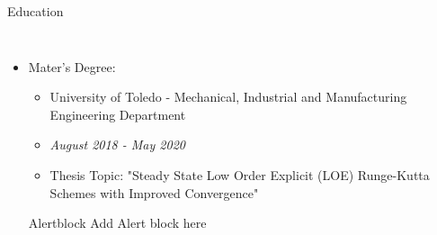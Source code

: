 
\begin{frame}{Education}
\begin{columns}
        \begin{itemize}
        \item Mater's Degree: 
        \begin{itemize}
           \item University of Toledo - Mechanical, Industrial and Manufacturing Engineering Department
           \item \textit{August 2018 - May 2020}
           \item Thesis Topic: "Steady State Low Order Explicit (LOE) Runge-Kutta Schemes with Improved Convergence"
        \end{itemize}
           \begin{alertblock}{Alertblock}
              Add Alert block here
           \end{alertblock}
        \end{itemize}   
    \end{columns}
\end{frame}

